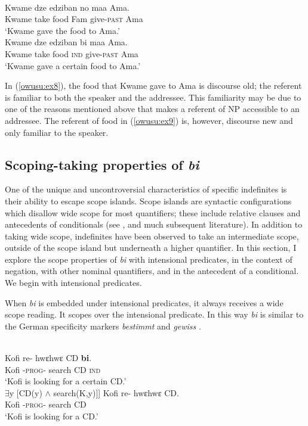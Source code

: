 \documentclass[output=paper,modfonts,nonflat,draftmode]{langsci/langscibook}
\begin{document}
\ea {}\\
\ea\label{owusu:ex8}
\gll  Kwame dze edziban no maa Ama.\\
   Kwame take food Fam give-\textsc{past} Ama \\ 
\glt `Kwame gave the food to Ama.'\\

\ex\label{owusu:ex9} 
\gll Kwame dze edziban bi maa Ama.\\
   Kwame take food \textsc{ind} give-\textsc{past} Ama \\ 
\glt `Kwame gave a certain food to Ama.'\\
\z \z 

In (\ref{owusu:ex8}), the food that Kwame gave to Ama is discourse old; the referent is familiar to both the speaker and the addressee. This familiarity may be due to one of the reasons mentioned above that makes a referent of NP accessible to an addressee. The referent of food in (\ref{owusu:ex9}) is, however, discourse new and only familiar to the speaker.
	 
\subsection{Scoping-taking properties of \emph{bi}}
One of the unique and uncontroversial characteristics of specific indefinites is their ability to escape scope islands. Scope islands are syntactic configurations which disallow wide scope for most quantifiers; these include relative clauses and antecedents of conditionals (see \citealt{FodorSag1982}, and much subsequent literature). In addition to taking wide scope, indefinites have been observed to take an intermediate scope, outside of the scope island but underneath a higher quantifier. In this section, I explore the scope properties of \emph{bi} with intensional predicates, in the context of negation, with other nominal quantifiers, and in the antecedent of a conditional. We begin with intensional predicates.

When \emph{bi} is embedded under intensional predicates, it always receives a wide scope reading. It scopes over the intensional predicate. In this way \emph{bi} is similar to the German specificity markers \emph{bestimmt} and \emph{gewiss} \citep{EbertEtAl2012}.
   
 \ea 
 \\
 \ea \label{006}
\gll Kofi re- hwεhwε CD \textbf{bi}.\\
    Kofi -\textsc{prog}-  search CD \textsc{ind}\\
\glt `Kofi is looking for a certain CD.'\\
$\exists$y [CD(y) $\wedge$ search(K,y)]]
\ex\label{006b}
\gll Kofi re- hwεhwε CD.\\
 Kofi -\textsc{prog}-  search CD  \\
\glt `Kofi is looking for a CD.'
\z \z 
\end{document}
